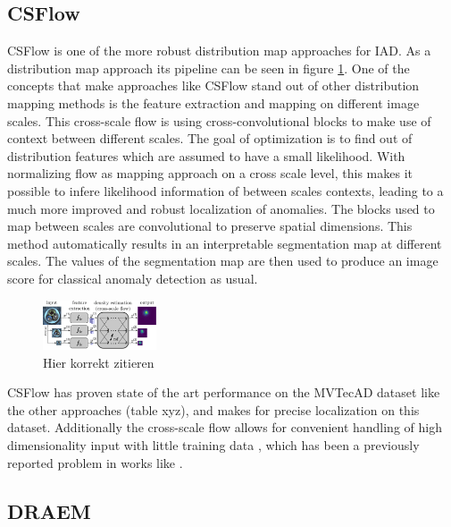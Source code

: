 \subsection{CSFlow}
\label{subsec:csflow}

CSFlow \cite{csflow2022} is one of the more robust distribution map approaches for IAD. As a distribution map approach its pipeline can be seen in figure \ref{fig:csflowpipeline}. One of the concepts that make 
approaches like CSFlow stand out of other distribution mapping methods is the feature extraction and mapping on different image scales. This cross-scale flow is using cross-convolutional 
blocks \cite{liu2024deep} to make use of context between different scales. The goal of optimization is to find out of distribution features which are assumed to have a small likelihood. 
With normalizing flow \cite{Kobyzev_2021normalizingflowexplanation} as mapping approach on a cross scale level, this makes it possible to infere likelihood information of between scales contexts, 
leading to a much more improved and robust localization of anomalies. The blocks used to map between scales 
are convolutional to preserve spatial dimensions. This method automatically results in an interpretable segmentation map at different scales. The values of the segmentation map are then used to produce an 
image score for classical anomaly detection as usual.

\begin{figure}[ht]
    \centering
    \includegraphics[width=0.3\textwidth]{figures/csflow_pipeline.png}
    \caption{Hier korrekt zitieren}
    \label{fig:csflowpipeline}
\end{figure}

CSFlow has proven state of the art performance on the MVTecAD dataset like the other approaches (table xyz), and makes for precise localization on this dataset. Additionally the cross-scale flow allows 
for convenient handling of high dimensionality input with little training data \cite{csflow2022}, which has been a previously reported problem in works like \cite{Rudolph_2021badNF}.


\subsection{DRAEM}
\label{subsec:DRAEM}

